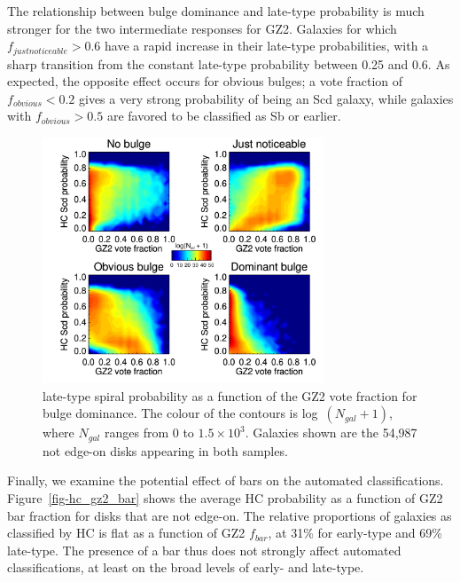 \documentclass[useAMS,usenatbib]{mn2e}
\begin{document}
The relationship between bulge dominance and late-type probability is much stronger for the two intermediate responses for GZ2. Galaxies for which $f_{just noticeable}>0.6$ have a rapid increase in their late-type probabilities, with a sharp transition from the constant late-type probability between 0.25 and 0.6. As expected, the opposite effect occurs for obvious bulges; a vote fraction of $f_{obvious}<0.2$ gives a very strong probability of being an Scd galaxy, while galaxies with $f_{obvious}>0.5$ are favored to be classified as Sb or earlier. 

\begin{figure}
\includegraphics[angle=0,width=3.3in]{figures/hc_gz2_bulge_contour.pdf}
\caption{\citet{hue11} late-type spiral probability as a function of the GZ2 vote fraction for bulge dominance. The colour of the contours is log~$(N_{gal} + 1)$, where $N_{gal}$ ranges from 0 to $1.5\times10^3$. Galaxies shown are the 54,987 not edge-on disks appearing in both samples.
\label{fig-hc_gz2_bulge_contour}}
\end{figure}

Finally, we examine the potential effect of bars on the automated classifications. Figure~\ref{fig-hc_gz2_bar} shows the average HC probability as a function of GZ2 bar fraction for disks that are not edge-on. The relative proportions of galaxies as classified by HC is flat as a function of GZ2 $f_{bar}$, at 31\% for early-type and 69\% late-type. The presence of a bar thus does not strongly affect automated classifications, at least on the broad levels of early- and late-type. 
\end{document}
